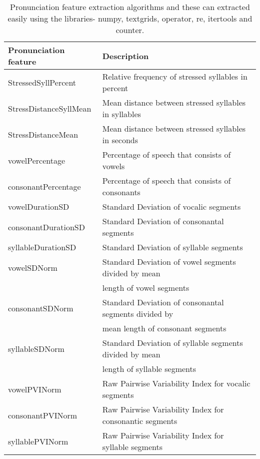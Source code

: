 \documentclass[sigconf]{acmart}
\begin{document}
\begin{table*}[ht]
\begin{tabular}{@{}|l|l|@{}}  \toprule
\textbf{Pronunciation feature} & \textbf{Description} \\ \midrule \midrule
StressedSyllPercent & Relative frequency of stressed syllables in percent\\ \midrule
StressDistanceSyllMean & Mean distance between stressed syllables in syllables\\ \midrule
StressDistanceMean & Mean distance between stressed syllables in seconds\\ \midrule
vowelPercentage & Percentage of speech that consists of vowels\\ \midrule
consonantPercentage & Percentage of speech that consists of consonants\\ \midrule
vowelDurationSD & Standard Deviation of vocalic segments\\ \midrule
consonantDurationSD & Standard Deviation of consonantal segments\\ \midrule
syllableDurationSD & Standard Deviation of syllable segments\\ \midrule
vowelSDNorm & Standard Deviation of vowel segments divided by mean\\ & length of vowel segments\\ \midrule
consonantSDNorm & Standard Deviation of consonantal segments divided by\\ & mean length of consonant segments\\ \midrule
syllableSDNorm & Standard Deviation of syllable segments divided by mean\\ & length of syllable segments\\ \midrule
vowelPVINorm & Raw Pairwise Variability Index for vocalic segments\\ \midrule
consonantPVINorm & Raw Pairwise Variability Index for consonantic segments\\ \midrule
syllablePVINorm & Raw Pairwise Variability Index for syllable segments\\ \midrule
\bottomrule
\end{tabular}
\caption{ \label{table: pronunciation feature extraction}Pronunciation feature extraction algorithms and these can extracted easily using the libraries- numpy, textgrids, operator, re, itertools and counter. 
}
\end{table*}
\end{document}
